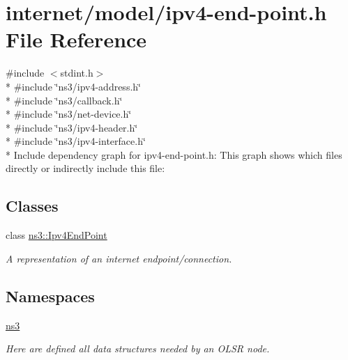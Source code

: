 \hypertarget{ipv4-end-point_8h}{}\section{internet/model/ipv4-\/end-\/point.h File Reference}
\label{ipv4-end-point_8h}
{\ttfamily \#include $<$stdint.\+h$>$}\\*
{\ttfamily \#include \char`\"{}ns3/ipv4-\/address.\+h\char`\"{}}\\*
{\ttfamily \#include \char`\"{}ns3/callback.\+h\char`\"{}}\\*
{\ttfamily \#include \char`\"{}ns3/net-\/device.\+h\char`\"{}}\\*
{\ttfamily \#include \char`\"{}ns3/ipv4-\/header.\+h\char`\"{}}\\*
{\ttfamily \#include \char`\"{}ns3/ipv4-\/interface.\+h\char`\"{}}\\*
Include dependency graph for ipv4-\/end-\/point.h\+:
This graph shows which files directly or indirectly include this file\+:
\subsection*{Classes}
\begin{DoxyCompactItemize}
\item 
class \hyperlink{classns3_1_1Ipv4EndPoint}{ns3\+::\+Ipv4\+End\+Point}
\begin{DoxyCompactList}\small\item\em A representation of an internet endpoint/connection. \end{DoxyCompactList}\end{DoxyCompactItemize}
\subsection*{Namespaces}
\begin{DoxyCompactItemize}
\item 
 \hyperlink{namespacens3}{ns3}
\begin{DoxyCompactList}\small\item\em Here are defined all data structures needed by an O\+L\+SR node. \end{DoxyCompactList}\end{DoxyCompactItemize}
